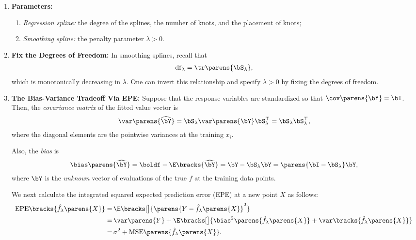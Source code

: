 \documentclass[12pt]{article}
\begin{document}
\begin{enumerate}[label=\textbf{\arabic*.}]

	\item \textbf{Parameters:} 
	\begin{enumerate}
		\item \textit{Regression spline:} the degree of the splines, the number of knots, and the placement of knots; 
		\item \textit{Smoothing spline:} the penalty parameter $\lambda > 0$. 
	\end{enumerate}
	
	\item \textbf{Fix the Degrees of Freedom:} In smoothing splines, recall that 
	\begin{align*}
		\mathrm{df}_\lambda = \tr \parens{\bS_\lambda}, 
	\end{align*}
	which is monotonically decreasing in $\lambda$. One can invert this relationship and specify $\lambda > 0$ by fixing the degrees of freedom. 
	
	\item \textbf{The Bias-Variance Tradeoff Via EPE:} Suppose that the response variables are standardized so that $\cov\parens{\bY} = \bI$. Then, the \textit{covariance matrix} of the fitted value vector is 
	\begin{align*}
		\var \parens{\widehat{\bY}} = \bS_\lambda \var \parens{\bY} \bS_\lambda^\top = \bS_\lambda \bS_\lambda^\top, 
	\end{align*}
	where the diagonal elements are the pointwise variances at the training $x_i$. 
	
	Also, the \textit{bias} is 
	\begin{align*}
		\bias \parens{\widehat{\bY}} = \boldf - \E \bracks{\widehat{\bY}} = \bY - \bS_\lambda \bY = \parens{\bI - \bS_\lambda} \bY, 
	\end{align*}
	where $\bY$ is the \textit{unknown} vector of evaluations of the true $f$ at the training data points. 
	
	We next calculate the integrated squared expected prediction error (EPE) at a new point $X$ as follows: 
	\begin{align*}
		\mathrm{EPE} \bracks{\hat{f}_\lambda \parens{X} } = & \, \E \bracks[\big]{ \parens{Y - \hat{f}_\lambda \parens{X} }^2 } \nonumber \\ 
		= & \, \var \parens{Y} + \E \bracks[\big]{ \bias^2 \parens{\hat{f}_\lambda \parens{X} } + \var \bracks{\hat{f}_\lambda \parens{X}} } \nonumber \\
		= & \, \sigma^2 + \mathrm{MSE} \parens{\hat{f}_\lambda \parens{X} }. 
	\end{align*}
	

\end{enumerate}
\end{document}
